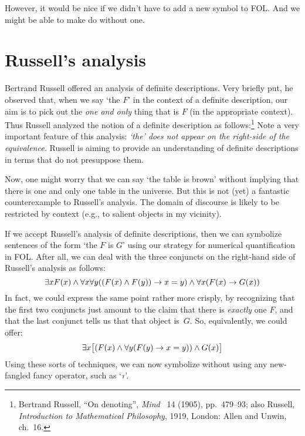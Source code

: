However, it would be nice if we didn't have to add a new symbol to FOL. And we might be able to make do without one.

\section{Russell's analysis}
Bertrand Russell offered an analysis of definite descriptions. Very
briefly put, he observed that, when we say `the $F$' in the context of
a definite description, our aim is to pick out the \emph{one and only}
thing that is $F$ (in the appropriate context). Thus Russell analyzed
the notion of a definite description as follows:\footnote{Bertrand
Russell, ``On denoting'',  \emph{Mind}~ 14 (1905), pp.\ 479--93; also
Russell, \textit{Introduction to Mathematical Philosophy}, 1919,
London: Allen and Unwin, ch.~16.}
Note a very important feature of this analysis: \emph{`the' does not appear on the right-side of the equivalence.} Russell is aiming to provide an understanding of definite descriptions in terms that do not presuppose them.

Now, one might worry that we can say `the table is brown' without implying that there is one and only one table in the universe. But this is not (yet) a fantastic counterexample to Russell's analysis. The domain of discourse is likely to be restricted by context (e.g., to salient objects in my vicinity).

If we accept Russell's analysis of definite descriptions, then we can symbolize sentences of the form `the $F$ is $G$' using our strategy for numerical quantification in FOL. After all, we can deal with the three conjuncts on the right-hand side of Russell's analysis as follows:
	$$\exists x F(x) \wedge \forall x \forall y ((F(x) \wedge F(y)) \rightarrow x = y) \wedge \forall x (F(x) \rightarrow G(x))$$
In fact, we could express the same point rather more crisply, by recognizing that the first two conjuncts just amount to the claim that there is \emph{exactly} one $F$, and that the last conjunct tells us that that object is~$G$. So, equivalently, we could offer:
	$$\exists x \bigl[(F(x) \wedge \forall y (F(y) \rightarrow x = y)) \wedge G(x)\bigr]$$
Using these sorts of techniques, we can now symbolize  without using any new-fangled fancy operator, such as `$\maththe$'.

